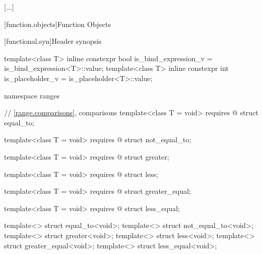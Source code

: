 [...]

\setcounter{section}{13}
[function.objects]{Function Objects}

[functional.syn]{Header  synopsis}

\begin{codeblock}
  [...]

  template<class T>
    inline constexpr bool is_bind_expression_v = is_bind_expression<T>::value;
  template<class T>
    inline constexpr int is_placeholder_v = is_placeholder<T>::value;
\end{codeblock}
\begin{addedblock}
\begin{codeblock}

  namespace ranges {
    // \ref{range.comparisons}, comparisons
    template<class T = void>
      requires @\seebelow@
    struct equal_to;

    template<class T = void>
      requires @\seebelow@
    struct not_equal_to;

    template<class T = void>
      requires @\seebelow@
    struct greater;

    template<class T = void>
      requires @\seebelow@
    struct less;

    template<class T = void>
      requires @\seebelow@
    struct greater_equal;

    template<class T = void>
      requires @\seebelow@
    struct less_equal;

    template<> struct equal_to<void>;
    template<> struct not_equal_to<void>;
    template<> struct greater<void>;
    template<> struct less<void>;
    template<> struct greater_equal<void>;
    template<> struct less_equal<void>;
  }
\end{codeblock}
\end{addedblock}
\begin{codeblock}
}
\end{codeblock}

